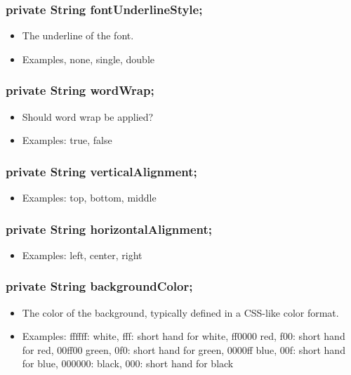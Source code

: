 \documentclass[letterpaper,10pt]{article}
\begin{document}
\subsubsection{private String fontUnderlineStyle;}
\begin{itemize}
 \item The underline of the font.
 \item Examples, none, single, double	
\end{itemize}

\subsubsection{private String wordWrap;}
\begin{itemize}
 \item Should word wrap be applied?
 \item Examples: true, false
\end{itemize}

\subsubsection{private String verticalAlignment;}
\begin{itemize}
 \item Examples: top, bottom, middle
\end{itemize}

\subsubsection{private String horizontalAlignment;}
\begin{itemize}
 \item Examples: left, center, right
\end{itemize}

\subsubsection{private String backgroundColor;}
\begin{itemize}
 \item The color of the background, typically defined in a CSS-like color format.
 \item Examples: ffffff: white, fff: short hand for white, ff0000 red, f00:
 short hand for red, 00ff00 green, 0f0: short hand for green, 0000ff
 blue, 00f: short hand for blue, 000000: black, 000: short hand for
 black
\end{itemize}
\end{document}
